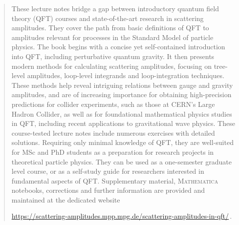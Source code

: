 %
\vfill
\begin{quote}
  These lecture notes bridge a gap between introductory quantum field theory (QFT) courses and state-of-the-art research in scattering amplitudes. They cover the path from basic definitions of QFT to amplitudes relevant for processes in the Standard Model of particle physics. The book begins with a concise yet self-contained introduction into QFT, including perturbative quantum gravity. It then presents modern methods for calculating scattering amplitudes, focusing on tree-level amplitudes, loop-level integrands and loop-integration techniques. These methods help reveal intriguing relations between gauge and gravity amplitudes, and are of increasing importance for obtaining high-precision predictions for collider experiments, such as those at CERN's Large Hadron Collider, as well as for foundational mathematical physics studies in QFT, including recent applications to gravitational wave physics.
\vskip 0.2cm
These course-tested lecture notes include numerous exercises with detailed solutions. Requiring only minimal knowledge of QFT, they are well-suited for MSc and PhD students as a preparation for research projects in theoretical particle physics. They can be used as a one-semester graduate level course, or as a self-study guide for researchers interested in fundamental aspects of QFT. Supplementary material, \textsc{Mathematica} notebooks, corrections and further information are provided and maintained at the dedicated website
%
\begin{center}
\href{https://scattering-amplitudes.mpp.mpg.de/scattering-amplitudes-in-qft/}{https://scattering-amplitudes.mpp.mpg.de/scattering-amplitudes-in-qft/}\,.
\end{center}
\end{quote}
